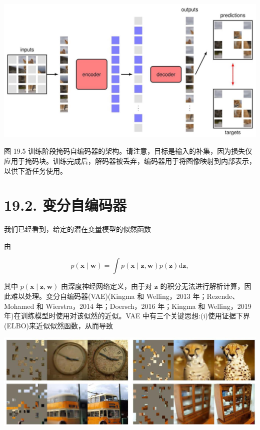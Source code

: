 \documentclass[10pt]{article}
\begin{document}
\begin{center}
\includegraphics[max width=1.0\textwidth]{images/0194e279-9b28-703a-88f4-c3ac21e2010d_588_201_348_1327_700_0.jpg}
\end{center}
\hspace*{3em} 

图 19.5 训练阶段掩码自编码器的架构。请注意，目标是输入的补集，因为损失仅应用于掩码块。训练完成后，解码器被丢弃，编码器用于将图像映射到内部表示，以供下游任务使用。

\section*{19.2. 变分自编码器}

我们已经看到，给定的潜在变量模型的似然函数

由

\[
p\left( {\mathbf{x} \mid  \mathbf{w}}\right)  = \int p\left( {\mathbf{x} \mid  \mathbf{z},\mathbf{w}}\right) p\left( \mathbf{z}\right) \mathrm{d}\mathbf{z}, \tag{19.4}
\]

其中 \(p\left( {\mathbf{x} \mid  \mathbf{z},\mathbf{w}}\right)\) 由深度神经网络定义，由于对 \(\mathbf{z}\) 的积分无法进行解析计算，因此难以处理。变分自编码器(VAE)(Kingma 和 Welling，2013 年；Rezende、Mohamed 和 Wierstra，2014 年；Doersch，2016 年；Kingma 和 Welling，2019 年)在训练模型时使用对该似然的近似。VAE 中有三个关键思想:(i)使用证据下界(ELBO)来近似似然函数，从而导致

\begin{center}
\includegraphics[max width=1.0\textwidth]{images/0194e279-9b28-703a-88f4-c3ac21e2010d_589_250_368_1296_455_0.jpg}
\end{center}
\hspace*{3em} 
\end{document}
